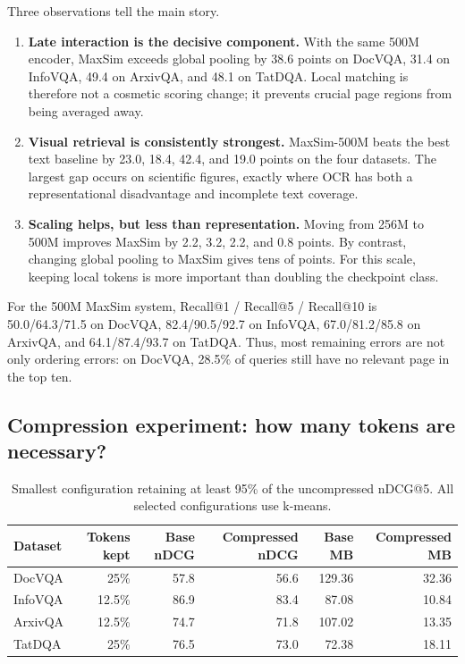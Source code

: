 \documentclass[11pt,a4paper]{article}
\begin{document}
Three observations tell the main story.
\begin{enumerate}
  \item \textbf{Late interaction is the decisive component.} With the same 500M encoder, MaxSim exceeds global pooling by 38.6 points on DocVQA, 31.4 on InfoVQA, 49.4 on ArxivQA, and 48.1 on TatDQA. Local matching is therefore not a cosmetic scoring change; it prevents crucial page regions from being averaged away.
  \item \textbf{Visual retrieval is consistently strongest.} MaxSim-500M beats the best text baseline by 23.0, 18.4, 42.4, and 19.0 points on the four datasets. The largest gap occurs on scientific figures, exactly where OCR has both a representational disadvantage and incomplete text coverage.
  \item \textbf{Scaling helps, but less than representation.} Moving from 256M to 500M improves MaxSim by 2.2, 3.2, 2.2, and 0.8 points. By contrast, changing global pooling to MaxSim gives tens of points. For this scale, keeping local tokens is more important than doubling the checkpoint class.
\end{enumerate}

For the 500M MaxSim system, Recall@1 / Recall@5 / Recall@10 is 50.0/64.3/71.5 on DocVQA, 82.4/90.5/92.7 on InfoVQA, 67.0/81.2/85.8 on ArxivQA, and 64.1/87.4/93.7 on TatDQA. Thus, most remaining errors are not only ordering errors: on DocVQA, 28.5\% of queries still have no relevant page in the top ten.

\subsection{Compression experiment: how many tokens are necessary?}

\begin{table}[H]
\centering
\caption{Smallest configuration retaining at least 95\% of the uncompressed nDCG@5. All selected configurations use k-means.}
\label{tab:compression}
\begin{tabular}{lrrrrr}
\toprule
Dataset & Tokens kept & Base nDCG & Compressed nDCG & Base MB & Compressed MB \\
\midrule
DocVQA & 25\% & 57.8 & 56.6 & 129.36 & 32.36 \\
InfoVQA & 12.5\% & 86.9 & 83.4 & 87.08 & 10.84 \\
ArxivQA & 12.5\% & 74.7 & 71.8 & 107.02 & 13.35 \\
TatDQA & 25\% & 76.5 & 73.0 & 72.38 & 18.11 \\
\bottomrule
\end{tabular}
\end{table}
\end{document}
